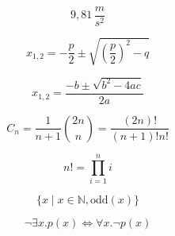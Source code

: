 $$9,81\,\frac{m}{s^2}$$

$$x_{1,2} = - \frac{p}{2} \pm \sqrt{\left(\frac{p}{2}\right)^2 - q}$$

$$x_{1,2} = \frac{-b \pm \sqrt{b^2 - 4ac}}{2a}$$

\begin{equation*}
  C_n = \frac{1}{n+1} {2n \choose n} = \frac{(2n)!}{(n+1)!n!}
\end{equation*}

$$n! = \prod_{i=1}^{n} i$$

$$\{ x \mid x \in \mathds{N}, \text{odd}(x) \}$$

$$\neg\exists x . p(x) \Leftrightarrow \forall x . \neg p(x)$$
